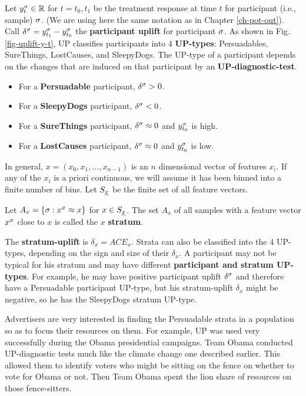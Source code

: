 Let $y^\sigma_t\in { \mathbb{R}}$ for $t=t_0, t_1$
be the treatment response at time $t$
for participant (i.e., sample) $\sigma$. (We are using here
the same notation as in Chapter \ref{ch-pot-out}).
Call $\delta^\sigma=
y^\sigma_{t_1}-y^\sigma_{t_0}$ the {\bf participant uplift}
for participant $\sigma$.
As shown
in Fig.\ref{fig-uplift-y-t},
UP classifies participants
into 4 {\bf UP-types}: Persuadables, SureThings, LostCauses,
and SleepyDogs.
The UP-type
of a participant
depends on the changes 
that are induced on that participant
by an {\bf UP-diagnostic-test}.
\begin{itemize}
\item
For a {\bf Persuadable} participant,
$\delta^\sigma>0$.
\item
For a {\bf SleepyDogs}
participant, $\delta^\sigma< 0$.
\item
For a {\bf SureThings} participant,
 $\delta^\sigma\approx 0$
and $y^\sigma_{t_0}$ is high.
\item
For a {\bf LostCauses} participant,
$\delta^\sigma\approx 0$
and $y^\sigma_{t_0}$ is low.
\end{itemize}

In general,
$x=(x_0, x_1,\dots, x_{n-1})$ is an $n$ dimensional 
vector of features $x_i$.
If any of the $x_i$
is a priori continuous, we will
assume it has  been binned into
a finite number of bins.
Let $S_\rvx$ be the finite set of  all feature vectors.


Let $A_x = \{\sigma: x^\sigma \approx x\}$ for  $x\in S_\rvx$.
The set $A_x$ of all samples with
a feature vector $x^\sigma$ close to $x$ 
is called the $x$ {\bf stratum}.



The {\bf stratum-uplift} is
 $\delta_x=ACE_x$.
Strata can also be
classified into
the 4 UP-types,
depending on the sign and size  
of their $\delta_x$.
A participant 
may not be typical for
his stratum
and may
have different
{\bf participant and stratum UP-types}.
For example, he may have positive 
participant uplift $\delta^\sigma$
and therefore have a Persuadable participant UP-type,
but his stratum-uplift  $\delta_x$
might be negative, so
he has
the SleepyDogs stratum UP-type.

Advertisers are very interested in finding
the Persuadable strata in a population
so as to focus their resources on them.
For example, UP was used very
successfully during the 
Obama presidential campaigns. 
Team Obama conducted UP-diagnostic
tests much like
the climate change one described earlier.
This allowed them to
identify voters who might be sitting on the fence
on whether to vote for Obama or not.
Then Team Obama spent
the lion share
of  resources  on those
fence-sitters.


